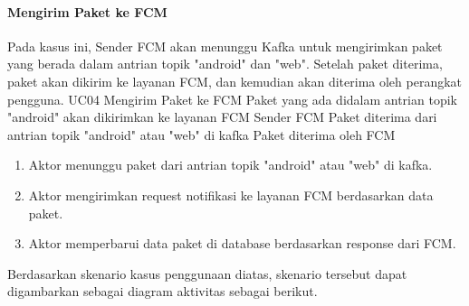 \paragraph{Mengirim Paket ke FCM}
\par Pada kasus ini, Sender FCM akan menunggu Kafka untuk mengirimkan paket yang berada dalam antrian topik "android" dan "web".
Setelah paket diterima, paket akan dikirim ke layanan FCM, dan kemudian akan diterima oleh perangkat pengguna.
\tableUcDesc
{UC04}
{Mengirim Paket ke FCM}
{Paket yang ada didalam antrian topik "android" akan dikirimkan ke layanan FCM}
{Sender FCM}
{Paket diterima dari antrian topik "android" atau "web" di kafka}
{Paket diterima oleh FCM}
{
\begin{enumerate}
    \item Aktor menunggu paket dari antrian topik "android" atau "web" di kafka.
    \item Aktor mengirimkan request notifikasi ke layanan FCM berdasarkan data paket.
    \item Aktor memperbarui data paket di database berdasarkan response dari FCM.
\end{enumerate}
}
\par Berdasarkan skenario kasus penggunaan diatas, skenario tersebut dapat digambarkan sebagai diagram aktivitas
sebagai berikut.
